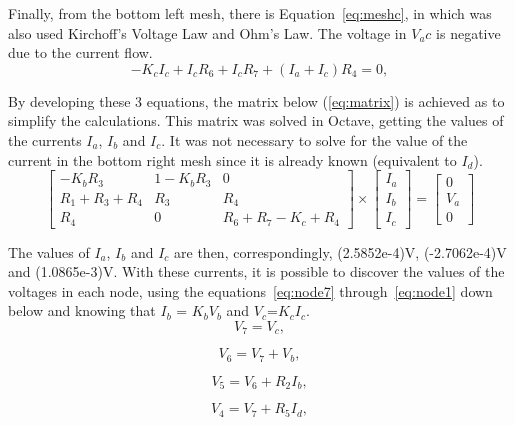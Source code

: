 Finally, from the bottom left mesh, there is Equation~\ref{eq:meshc}, in which was also used Kirchoff's Voltage Law and Ohm's Law. The voltage in $V_ac$ is negative due to the current flow.
\begin{equation}
  -K_{c}I_{c} + I_{c}R_{6} + I_{c}R_{7} + (I_{a} + I_{c})R_{4} = 0,
  \label{eq:meshc}
\end{equation}

By developing these 3 equations, the matrix below (\ref{eq:matrix}) is achieved as to simplify the calculations. This matrix was solved in Octave, getting the values of the currents $I_a$, $I_b$ and $I_c$. It was not necessary to solve for the value of the current in the bottom right mesh since it is already known (equivalent to $I_d$).
\begin{equation}
\left[ \begin{array}{ccc} -K_bR_3 & 1-K_bR_3 & 0 \\ R_1+R_3+R_4 & R_3 & R_4 \\ R_4 & 0 & R_6+R_7-K_c+R_4 \end{array} \right]
\times \left[ \begin{array}{c} I_a \\ I_b \\ I_c \end{array} \right] =
\left[ \begin{array}{c} 0 \\ V_a \\ 0 \end{array} \right]
\label{eq:matrix}
\end{equation}

The values of $I_a$, $I_b$ and $I_c$ are then, correspondingly, (2.5852e-4)V, (-2.7062e-4)V and (1.0865e-3)V. With these currents, it is possible to discover the values of the voltages in each node, using the equations~\ref{eq:node7} through~\ref{eq:node1} down below and knowing that $I_b$ = $K_b$$V_b$ and $V_c$=$K_c$$I_c$.
\begin{equation}
  V_{7} = V_{c},
  \label{eq:node7}
\end{equation}

\begin{equation}
  V_{6} = V_{7} + V_{b},
  \label{eq:node6}
\end{equation}

\begin{equation}
  V_{5} = V_{6} + R_{2}I_{b},
  \label{eq:node5}
\end{equation}

\begin{equation}
  V_{4} = V_{7} + R_{5}I_{d},
  \label{eq:node4}
\end{equation}

